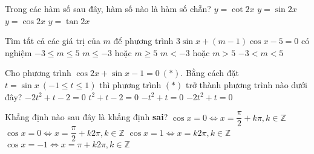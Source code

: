 \begin{ex}%
	Trong các hàm số sau đây, hàm số nào là hàm số chẵn?
	\choice
	{$y=\cot 2x $}
	{$y=\sin 2x  $}
	{\True $y=\cos 2x  $}
	{$y=\tan 2x $}
\end{ex}
\begin{ex}%
	Tìm tất cả các giá trị của $ m $ để phương trình $ 3\sin x+(m-1)\cos x-5=0 $ có nghiệm
	\choice
	{$-3\leq m \leq 5 $}
	{\True $ m\leq -3 $ hoặc $ m \geq 5 $}
	{$ m<-3 $ hoặc $ m>5 $}
	{$ -3<m<5$}
\end{ex}
\begin{ex}%
	Cho phương trình $ \cos 2x+\sin x-1=0 ~(*)$. Bằng cách đặt $ t=\sin x ~ (-1 \leq t\leq 1)$ thì phương trình $ (*) $ trở thành phương trình nào dưới đây?
	\choice
	{$-2t^2+t-2=0 $}
	{$ t^2+t-2=0 $}
	{$ -t^2+t=0 $}
	{\True $ -2t^2+t=0$}
\end{ex}
\begin{ex}%
	Khẳng định nào sau đây là khẳng định \textbf{sai}?
	\choice
	{$\cos x=0 \Leftrightarrow x=\dfrac{\pi}{2}+k\pi,  k\in \mathbb{Z} $}
	{\True $  \cos x=0 \Leftrightarrow x=\dfrac{\pi}{2}+k2\pi,  k\in \mathbb{Z}$}
	{$ \cos x=1\Leftrightarrow x=k2\pi,  k\in \mathbb{Z} $}
	{$ \cos x=-1 \Leftrightarrow x=\pi+k2\pi,  k\in \mathbb{Z}$}
\end{ex}
